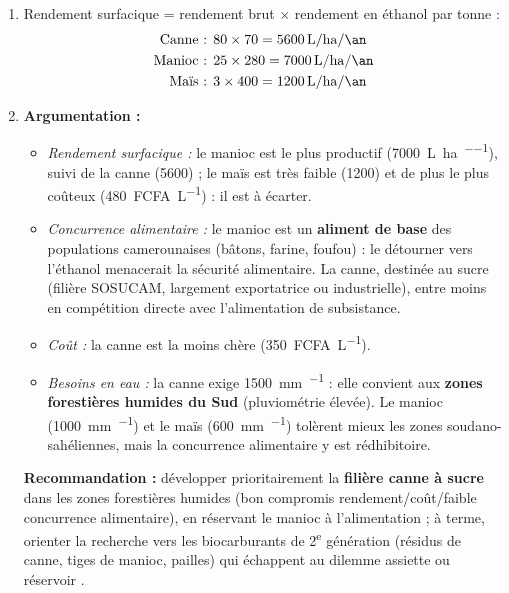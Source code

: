 \documentclass[11pt]{article}
\begin{document}
\begin{corrige}
\begin{enumerate}
\item Rendement surfacique = rendement brut $\times$ rendement en éthanol par tonne :
\begin{align*}
\text{Canne : } & 80 \times 70 = \SI{5600}{\liter\per\hectare\per\an} \\
\text{Manioc : } & 25 \times 280 = \SI{7000}{\liter\per\hectare\per\an} \\
\text{Maïs : } & 3 \times 400 = \SI{1200}{\liter\per\hectare\per\an}
\end{align*}
\item \textbf{Argumentation :}
\begin{itemize}
\item \emph{Rendement surfacique :} le manioc est le plus productif (\SI{7000}{\liter\per\hectare\per\an}), suivi de la canne (\SI{5600}{}) ; le maïs est très faible (\SI{1200}{}) et de plus le plus coûteux (\SI{480}{FCFA\per\liter}) : il est à écarter.
\item \emph{Concurrence alimentaire :} le manioc est un \textbf{aliment de base} des populations camerounaises (bâtons, farine, foufou) : le détourner vers l'éthanol menacerait la sécurité alimentaire. La canne, destinée au sucre (filière SOSUCAM, largement exportatrice ou industrielle), entre moins en compétition directe avec l'alimentation de subsistance.
\item \emph{Coût :} la canne est la moins chère (\SI{350}{FCFA\per\liter}).
\item \emph{Besoins en eau :} la canne exige \SI{1500}{mm\per\an} : elle convient aux \textbf{zones forestières humides du Sud} (pluviométrie élevée). Le manioc (\SI{1000}{mm\per\an}) et le maïs (\SI{600}{mm\per\an}) tolèrent mieux les zones soudano-sahéliennes, mais la concurrence alimentaire y est rédhibitoire.
\end{itemize}
\textbf{Recommandation :} développer prioritairement la \textbf{filière canne à sucre} dans les zones forestières humides (bon compromis rendement/coût/faible concurrence alimentaire), en réservant le manioc à l'alimentation ; à terme, orienter la recherche vers les biocarburants de 2\textsuperscript{e} génération (résidus de canne, tiges de manioc, pailles) qui échappent au dilemme \og assiette ou réservoir \fg.
\end{enumerate}
\end{corrige}
\end{document}
